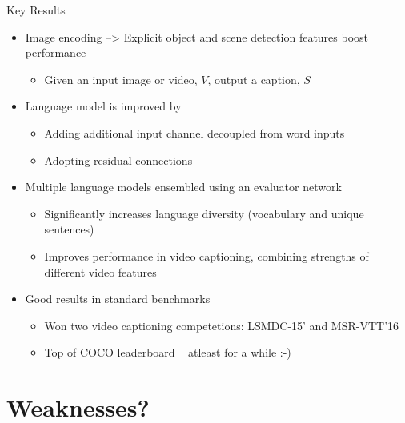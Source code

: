 \documentclass{beamer}
\begin{document}
\begin{frame}{Key Results}
\begin{itemize}
\item Image encoding --> Explicit object and scene detection features boost performance
    \begin{itemize}
         \item Given an input image or video, $V$, output a caption, $S$
    \end{itemize} 
\item Language model is improved by 
    \begin{itemize}
        \item Adding additional input channel decoupled from word inputs
        \item Adopting residual connections 
    \end{itemize}
\item Multiple language models ensembled using an evaluator network
    \begin{itemize}
        \item Significantly increases language diversity (vocabulary and unique sentences) 
        \item Improves performance in video captioning, combining strengths of different video features 
    \end{itemize}
\item Good results in standard benchmarks
    \begin{itemize}
        \item Won two video captioning competetions: LSMDC-15' and MSR-VTT'16 
        \item Top of COCO leaderboard ~ atleast for a while :-) 
    \end{itemize}
\end{itemize}
\end{frame}

\section{Weaknesses?}
\end{document}
